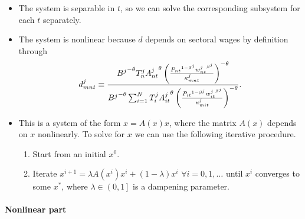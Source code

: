 \documentclass[12pt]{article}
\begin{document}
\begin{itemize}
\item The system is separable in $t$, so we can solve the corresponding
subsystem for each $t$ separately.

\item The system is nonlinear because $d$ depends on sectoral wages by
definition through 
\begin{equation*}
d_{mnt}^j \equiv \frac{{B^j}^{-\theta} T_n^j {A_{nt}^j}^{\theta} \left(\frac{%
{P_{nt}}^{1 - \beta^j} {w_{nt}^j}^{\beta^j}}{\kappa_{mnt}^j}\right)^{-\theta}%
}{{B^j}^{-\theta} \sum_{i = 1}^N T_i^j {A_{it}^j}^{\theta} \left(\frac{{%
P_{it}}^{1 - \beta^j} {w_{it}^j}^{\beta^j}}{\kappa_{mit}^j}\right)^{-\theta}}%
.
\end{equation*}

\item This is a system of the form $x = A(x) x$, where the matrix $A(x)$
depends on $x$ nonlinearly. To solve for $x$ we can use the following
iterative procedure.

\begin{enumerate}
\item Start from an initial $x^0$.

\item Iterate $x^{i + 1} = \lambda A(x^i) x^i + (1 - \lambda) x^i$ $\forall
i = 0, 1, \dots$ until $x^i$ converges to some $x^*$, where $\lambda \in
\left(0,1\right]$ is a dampening parameter.
\end{enumerate}
\end{itemize}

\paragraph{Nonlinear part}
\end{document}
